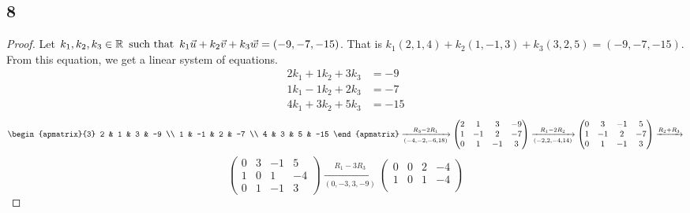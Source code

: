 \documentclass{article}
\begin{document}
\subsection*{8}
\begin{enumerate}
    \begin{proof}
        Let $k_1,k_2,k_3 \in \mathbb{R} \operatorname{~\text{such that}~} k_1\vec{u} + k_2\vec{v} + k_3\vec{w} = (-9,-7,-15)$. That is $k_1(2,1,4) + k_2(1,-1,3) + k_3(3,2,5) = (-9,-7,-15)$. From this equation, we get a linear system of equations.
        \begin{align*}
            2k_1 + 1k_2 + 3k_3 & = -9  \\
            1k_1 - 1k_2 + 2k_3 & = -7  \\
            4k_1 + 3k_2 + 5k_3 & = -15
        \end{align*}
        \[
            \begin{apmatrix}{3}
                2 & 1 & 3 & -9 \\
                1 & -1 & 2 & -7 \\
                4 & 3 & 5 & -15
            \end{apmatrix} \xrightarrow[(-4,-2,-6,18)]{R_3 - 2R_1}
            \begin{pmatrix}
                2 & 1  & 3  & -9 \\
                1 & -1 & 2  & -7 \\
                0 & 1  & -1 & 3
            \end{pmatrix} \xrightarrow[(-2,2,-4,14)]{R_1 - 2R_2}
            \begin{pmatrix}
                0 & 3  & -1 & 5  \\
                1 & -1 & 2  & -7 \\
                0 & 1  & -1 & 3
            \end{pmatrix} \xrightarrow{R_2 + R_3}
        \]
        \[
            \begin{pmatrix}
                0 & 3 & -1 & 5  \\
                1 & 0 & 1  & -4 \\
                0 & 1 & -1 & 3
            \end{pmatrix} \xrightarrow[(0,-3,3,-9)]{R_1 - 3R_3}
            \begin{pmatrix}
                0 & 0 & 2  & -4 \\
                1 & 0 & 1  & -4 \\

\end{pmatrix}\]
\end{proof}
\end{enumerate}
\end{document}
